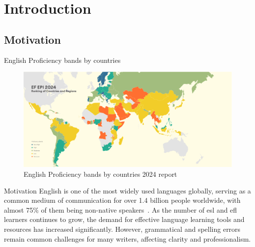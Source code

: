 \section{Introduction}

\subsection{Motivation}
\begin{frame}{English Proficiency bands by countries}
  \begin{figure}
    \begin{center}
      \includegraphics[width=\textwidth]{figures/ef-epi-2024-english-crop.pdf}
    \end{center}
    \caption{English Proficiency bands by countries 2024 report}\label{fig:ef-epi}
  \end{figure}
\end{frame}

\begin{frame}{Motivation}
  English is one of the most widely used languages globally, serving as a common medium of communication for over \alert{1.4 billion} people worldwide, with almost \alert{75\%} of them being non-native speakers~\citep{eberhard2015ethnologue}.
  As the number of esl and efl learners continues to grow, the demand for effective language learning tools and resources has increased significantly.
  However, grammatical and spelling errors remain common challenges for many writers, affecting clarity and professionalism.
\end{frame}

